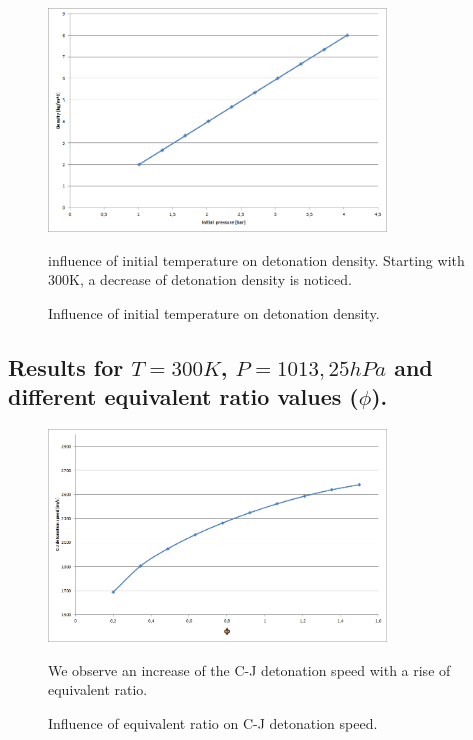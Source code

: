 \documentclass[11pt]{article}
\begin{document}
 \begin{figure} [H]
	\begin{center}
    	\includegraphics[width=0.8\textwidth]{fpress_dens}
        \caption{Influence of initial temperature on detonation density.}
    \end{center}
\normalsize
{influence of initial temperature on detonation density. Starting with 300K, a decrease of detonation density is noticed. }
\end{figure}











\subsection{Results for $T=300K$, $P=1013,25hPa$ and different equivalent ratio values ($\phi$).}

 
 \begin{figure} [H]
	\begin{center}
    	\includegraphics[width=0.8\textwidth]{ffi_speed}
        \caption{Influence of equivalent ratio on  C-J detonation speed.}
    \end{center}
\normalsize
{We observe an increase of the C-J detonation speed with a rise of equivalent ratio.}
\end{figure}
\end{document}
